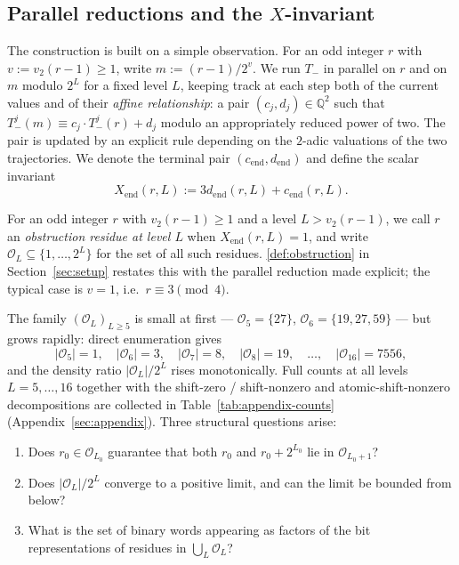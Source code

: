 \documentclass[11pt,reqno]{amsart}
\newcommand{\Tminus}{T_{-}}
\newcommand{\Q}{\mathbb{Q}}
\newcommand{\Obs}{\mathcal{O}}
\newcommand{\Xend}{X_{\mathrm{end}}}
\newcommand{\cend}{c_{\mathrm{end}}}
\newcommand{\dend}{d_{\mathrm{end}}}
\newcommand{\vtwo}{v_{2}}
\begin{document}
\subsection{Parallel reductions and the \texorpdfstring{$X$}{X}-invariant}

The construction is built on a simple observation. For an odd integer $r$
with $v := \vtwo(r-1) \ge 1$, write $m := (r-1)/2^v$. We run
$\Tminus$ in parallel on $r$ and on $m$ modulo $2^L$ for a fixed level $L$,
keeping track at each step both of the current values and of their
\emph{affine relationship}: a pair $(c_j, d_j) \in \Q^2$ such that
$\Tminus^j(m) \equiv c_j \cdot \Tminus^j(r) + d_j$ modulo an
appropriately reduced power of two. The pair is updated by an explicit rule
depending on the $2$-adic valuations of the two trajectories. We denote the
terminal pair $(\cend, \dend)$ and define the scalar invariant
\[
\Xend(r, L) := 3 \dend(r, L) + \cend(r, L).
\]

For an odd integer $r$ with $\vtwo(r-1) \ge 1$ and a level $L > \vtwo(r-1)$,
we call $r$ an \emph{obstruction residue at level $L$} when
$\Xend(r, L) = 1$, and write $\Obs_L \subseteq \{1, \ldots, 2^L\}$ for
the set of all such residues. \cref{def:obstruction} in
Section~\ref{sec:setup} restates this with the parallel reduction made
explicit; the typical case is $v = 1$, i.e.\ $r \equiv 3 \pmod 4$.

The family $(\Obs_L)_{L \ge 5}$ is small at first --- $\Obs_5 = \{27\}$,
$\Obs_6 = \{19, 27, 59\}$ --- but grows rapidly: direct enumeration gives
\[
|\Obs_5| = 1, \quad |\Obs_6| = 3, \quad |\Obs_7| = 8, \quad |\Obs_8| = 19, \quad \ldots, \quad |\Obs_{16}| = 7556,
\]
and the density ratio $|\Obs_L|/2^L$ rises monotonically. Full counts at
all levels $L = 5, \ldots, 16$ together with the shift-zero / shift-nonzero
and atomic-shift-nonzero decompositions are collected in
Table~\ref{tab:appendix-counts} (Appendix~\ref{sec:appendix}). Three structural
questions arise:

\begin{enumerate}[label=(Q\arabic*)]
\item Does $r_0 \in \Obs_{L_0}$ guarantee that both $r_0$ and $r_0 + 2^{L_0}$
  lie in $\Obs_{L_0+1}$?
\item Does $|\Obs_L|/2^L$ converge to a positive limit, and can the limit
  be bounded from below?
\item What is the set of binary words appearing as factors of the bit
  representations of residues in $\bigcup_L \Obs_L$?
\end{enumerate}
\end{document}

